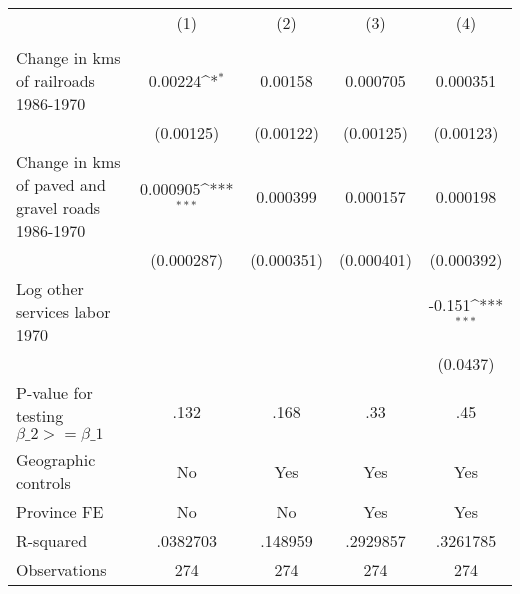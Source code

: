 {
\def\sym#1{\ifmmode^{#1}\else\(^{#1}\)\fi}
\begin{tabular}{l*{4}{c}}
\hline\hline
                &\multicolumn{1}{c}{(1)}&\multicolumn{1}{c}{(2)}&\multicolumn{1}{c}{(3)}&\multicolumn{1}{c}{(4)}\\
                &\multicolumn{1}{c}{}&\multicolumn{1}{c}{}&\multicolumn{1}{c}{}&\multicolumn{1}{c}{}\\
\hline
Change in kms of railroads 1986-1970&  0.00224\sym{*}  &  0.00158         & 0.000705         & 0.000351         \\
                &(0.00125)         &(0.00122)         &(0.00125)         &(0.00123)         \\
[1em]
Change in kms of paved and gravel roads 1986-1970& 0.000905\sym{***}& 0.000399         & 0.000157         & 0.000198         \\
                &(0.000287)         &(0.000351)         &(0.000401)         &(0.000392)         \\
[1em]
Log other services labor 1970&                  &                  &                  &   -0.151\sym{***}\\
                &                  &                  &                  & (0.0437)         \\
\hline
P-value for testing $\beta\_{2} >= \beta\_{1}$&     .132         &     .168         &      .33         &      .45         \\
Geographic controls&       No         &      Yes         &      Yes         &      Yes         \\
Province FE     &       No         &       No         &      Yes         &      Yes         \\
R-squared       & .0382703         &  .148959         & .2929857         & .3261785         \\
Observations    &      274         &      274         &      274         &      274         \\
\hline\hline
\end{tabular}
}
